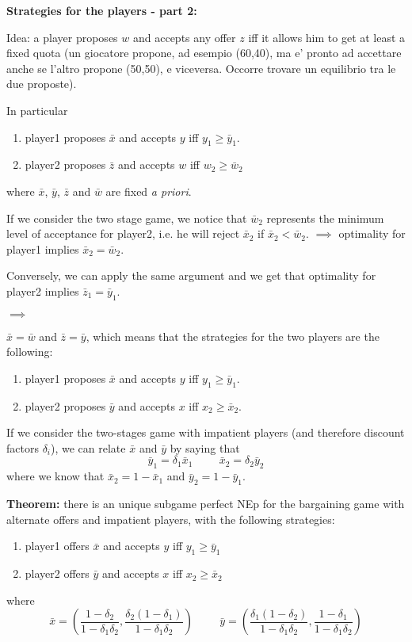 \bigskip
\noindent \textbf{Strategies for the players - part 2:}

\noindent Idea: a player proposes $w$ and accepts any offer $z$ iff it allows him to get at least a fixed quota (un giocatore propone, ad esempio (60,40), ma e' pronto ad 
accettare anche se l'altro propone (50,50), e viceversa. Occorre trovare 
un equilibrio tra le due proposte).

\noindent In particular
\begin{enumerate}
	\item player1 proposes $\bar{x}$ and accepts $y$ iff $y_1 \geq \bar{y}_1$.
	\item player2 proposes $\bar{z}$ and accepts $w$ iff $w_2 \geq \bar{w}_2$
\end{enumerate}
where $\bar{x}$, $\bar{y}$, $\bar{z}$ and $\bar{w}$ are fixed \textit{a priori}.

\noindent If we consider the two stage game, we notice that $\bar{w}_2$ represents the minimum level of acceptance for player2, i.e. he will reject $\bar{x}_2$ if $\bar{x}_2 < \bar{w}_2$. $\implies$ optimality for player1 implies $\bar{x}_2 = \bar{w}_2$.

\noindent Conversely, we can apply the same argument and we get that optimality for player2 implies $\bar{z}_1 = \bar{y}_1$.

\noindent $\implies$

\noindent $\bar{x} = \bar{w}$ and $\bar{z} = \bar{y}$, which means that the strategies for the two players are the following:
\begin{enumerate}
	\item player1 proposes $\bar{x}$ and accepts $y$ iff $y_1 \geq \bar{y}_1$.
	\item player2 proposes $\bar{y}$ and accepts $x$ iff $x_2 \geq \bar{x}_2$.
\end{enumerate}

\noindent If we consider the two-stages game with impatient players (and therefore discount factors $\delta_i$), we can relate $\bar{x}$ and $\bar{y}$ by saying that
\[
	\bar{y}_1 = \delta_1\bar{x}_1 \hspace{1cm} \bar{x}_2 = \delta_2\bar{y}_2
\]
where we know that $\bar{x}_2 = 1 - \bar{x}_1$ and $\bar{y}_2 = 1 - \bar{y}_1$. 

\bigskip
\noindent \textbf{Theorem:} there is an unique subgame perfect NEp for the bargaining game with alternate offers and impatient players, with the following strategies:
\begin{enumerate}
	\item player1 offers $\bar{x}$ and accepts $y$ iff $y_1 \geq \bar{y}_1$
	\item player2 offers $\bar{y}$ and accepts $x$ iff $x_2 \geq \bar{x}_2$
\end{enumerate}
where
\[
	\bar{x} = \left( \frac{1-\delta_2}{1-\delta_1\delta_2}, 
					     \frac{\delta_2(1-\delta_1)}{1-\delta_1\delta_2} \right)
	\hspace{1cm}	
	\bar{y} = \left( \frac{\delta_1(1-\delta_2)}{1-\delta_1\delta_2},
	 					\frac{1-\delta_1}{1-\delta_1\delta_2} \right)
\]

